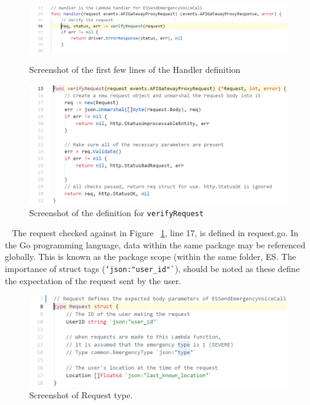 \documentclass[10pt, a4paper]{article}
\begin{document}
\begin{figure}[H]
  \ \includegraphics[scale=.6]{code-screenshots/five.png}
  \caption{Screenshot of the first few lines of the Handler definition}
\end{figure}

\begin{figure}[H]
  \includegraphics[scale=.6]{code-screenshots/six.png}
  \caption{Screenshot of the definition for \texttt{verifyRequest}}\label{fig:vr}
\end{figure}

\par ~ The request checked against in Figure ~\ref{fig:vr}, line 17, is defined in request.go. In the Go programming language, data within the same package may be referenced globally. This is known as the package scope (within the same folder, ES. The importance of struct tags (\texttt{`json:"user\_id"`}), should be noted as these define the expectation of the request sent by the user.

\begin{figure}[H]
  \includegraphics[scale=.6]{code-screenshots/eight.png}
  \caption{Screenshot of Request type.}
\end{figure}
\end{document}
